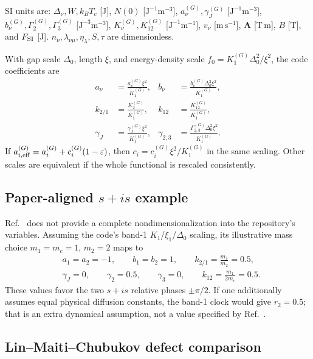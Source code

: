 \documentclass[11pt]{article}
\begin{document}
SI units are: $\Delta_\nu,W,k_BT_c$ [J], $N(0)$
[$\mathrm{J^{-1}m^{-3}}$], $a_\nu^{(G)},\gamma_J^{(G)}$
[$\mathrm{J^{-1}m^{-3}}$], $b_\nu^{(G)},\Gamma_2^{(G)},\Gamma_3^{(G)}$
[$\mathrm{J^{-3}m^{-3}}$], $K_\nu^{(G)},K_{12}^{(G)}$
[$\mathrm{J^{-1}m^{-1}}$], $v_\nu$ [$\mathrm{m\,s^{-1}}$], $\mathbf A$
[$\mathrm{T\,m}$], $B$ [T], and $F_{\rm SI}$ [J].
$n_\nu,\lambda_{\nu\mu},\eta_\lambda,S,\tau$ are dimensionless.

With gap scale $\Delta_0$, length $\xi$, and energy-density scale
$f_0=K_1^{(G)}\Delta_0^2/\xi^2$, the code coefficients are
\begin{align}
    a_\nu&=\frac{a_\nu^{(G)}\xi^2}{K_1^{(G)}},&
    b_\nu&=\frac{b_\nu^{(G)}\Delta_0^2\xi^2}{K_1^{(G)}},\\
    k_{2/1}&=\frac{K_2^{(G)}}{K_1^{(G)}},&
    k_{12}&=\frac{K_{12}^{(G)}}{K_1^{(G)}},\\
    \gamma_J&=\frac{\gamma_J^{(G)}\xi^2}{K_1^{(G)}},&
    \gamma_{2,3}&=\frac{\Gamma_{2,3}^{(G)}\Delta_0^2\xi^2}
                         {K_1^{(G)}}.
    \label{eq:ss-code-map}
\end{align}
If $a_{i,{\rm eff}}^{(G)}=a_i^{(G)}+c_i^{(G)}(1-\varepsilon)$,
then $c_i=c_i^{(G)}\xi^2/K_1^{(G)}$ in the same scaling.
Other scales are equivalent if the whole functional is rescaled consistently.

\subsection{Paper-aligned $s+is$ example}

Ref.~\cite{Lin2016} does not provide a complete nondimensionalization into the
repository's variables.  Assuming the code's band-1 $K_1$/$\xi_1$/$\Delta_0$
scaling, its illustrative mass choice $m_1=m_c=1$, $m_2=2$ maps to
\begin{equation}
\begin{split}
  &a_1=a_2=-1,\qquad b_1=b_2=1,\qquad
  k_{2/1}=\frac{m_1}{m_2}=0.5,\\
  &\gamma_J=0,\qquad \gamma_2=0.5,\qquad \gamma_3=0,\qquad
  k_{12}=\frac{m_1}{2m_c}=0.5.
\end{split}
\label{eq:ss-lin-example}
\end{equation}
These values favor the two $s+is$ relative phases $\pm\pi/2$.  If one
additionally assumes equal physical diffusion constants, the band-1 clock
would give $r_2=0.5$; that is an extra dynamical assumption, not a value
specified by Ref.~\cite{Lin2016}.

\subsection{Lin--Maiti--Chubukov defect comparison}
\end{document}
